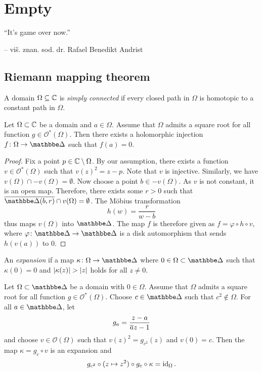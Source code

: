 \section{Empty}

\epigraph{``It's game over now.''}{-- viš. znan. sod. dr. Rafael
Benedikt Andrist}

\subsection{Riemann mapping theorem}


\begin{definicija}
A domain $\Omega \subseteq \mathbb{C}$ is
\emph{simply connected} if every closed
path in $\Omega$ is homotopic to a constant path in $\Omega$.
\end{definicija}

\begin{lema}
\label{thm_hol:lm:inj_exis}
Let $\Omega \subset \mathbb{C}$ be a domain and $a \in \Omega$. Assume that
$\Omega$ admits a square root for all function
$g \in \mathcal{O}^*(\Omega)$. Then there exists a holomorphic
injection $f \colon \Omega \to \dsk$ such that $f(a) = 0$.
\end{lema}

\begin{proof}
Fix a point $p \in \mathbb{C} \setminus \Omega$. By our assumption, there
exists a function $v \in \mathcal{O}^*(\Omega)$ such that
$v(z)^2 = z-p$. Note that $v$ is injective. Similarly, we have
$v(\Omega) \cap -v(\Omega) = \emptyset$. Now choose a point
$b \in -v(\Omega)$. As $v$ is not constant, it is an open map.
Therefore, there exists some $r > 0 $ such that
$\oline{\dsk(b, r)} \cap v(\Omega) = \emptyset$. The Möbius
transformation
\[
h(w) = \frac{r}{w-b}
\]
thus maps $v(\Omega)$ into $\dsk$. The map $f$ is therefore given
as $f = \varphi \circ h \circ v$, where
$\varphi \colon \dsk \to \dsk$ is a disk automorphism that sends
$h(v(a))$ to $0$.
\end{proof}

\begin{definicija}
An \emph{expansion} if a map
$\kappa \colon \Omega \to \dsk$ where $0 \in \Omega \subset \dsk$
such that $\kappa(0) = 0$ and $\left\lvert \kappa(z)\right\rvert > \left\lvert z\right\rvert$ holds for
all $z \ne 0$.
\end{definicija}

\begin{lema}
Let $\Omega \subset \dsk$ be a domain with $0 \in \Omega$. Assume
that $\Omega$ admits a square root for all function
$g \in \mathcal{O}^*(\Omega)$. Choose $c \in \dsk$ such that
$c^2 \not \in \Omega$. For all $a \in \dsk$, let
\[
g_a = \frac{z - a}{\overline{a} z - 1}
\]
and choose $v \in \mathcal{O}(\Omega)$ such that
$v(z)^2 = g_{c^2}(z)$ and $v(0) = c$. Then the map
$\kappa = g_c \circ v$ is an expansion and
\[
g_{c^2} \circ (z \mapsto z^2) \circ g_c \circ \kappa =
\operatorname{id}_{\Omega}.
\]
\end{lema}

